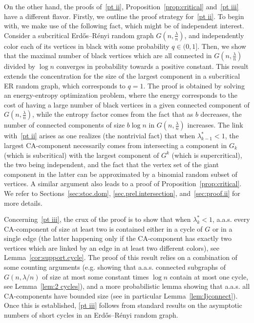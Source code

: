 \documentclass[10pt]{amsart}
\theoremstyle{definition}\newtheorem{defi}[theo]{Definition}\newtheorem{rema}[theo]{Remark}\newtheorem{exam}[theo]{Example}\newtheorem{exem}[theo]{Example}\newtheorem{nota}[theo]{Notation}
\begin{document}
On the other hand, the proofs of~\eqref{pt ii}, Proposition~\ref{prop:critical} and~\eqref{pt iii} have a different flavor. Firstly, we outline the proof strategy for~\eqref{pt ii}. To begin with, we make use of the following fact, which might be of independent interest. Consider a subcritical Erd\H{o}s--Rényi random graph $G(n,\frac{\lambda}{n})$, and independently color each of its vertices in black with some probability $q\in (0,1]$. Then, we show that the maximal number of black vertices which are all connected in $G(n,\frac{\lambda}{n})$ divided by $\log n$ converges in probability towards a positive constant. This result extends the concentration for the size of the largest component in a subcritical ER random graph, which corresponds to $q=1$. The proof is obtained by solving an energy-entropy optimization problem, where the energy corresponds to the cost of having a large number of black vertices in a given connected component of $G(n,\frac{\lambda}{n})$, while the entropy factor comes from the fact that as $b$ decreases, the number of connected components of size $b\log n$ in $G(n,\frac{\lambda}{n})$ increases. The link with~\eqref{pt ii} arises as one realizes (the nontrivial fact) that when $\lambda_{k-1}^*<1$, the largest CA-component necessarily comes from intersecting a component in $G_k$ (which is subcritical) with the largest component of $G^k$ (which is supercritical), the two being independent, and the fact that the vertex set of the giant component in the latter can be approximated by a binomial random subset of vertices. A similar argument also leads to a proof of Proposition~\ref{prop:critical}. We refer to Sections~\ref{sec:stoc.dom}, \ref{sec.prel.intersection}, and~\ref{sec:proof.ii} for more details.

Concerning~\eqref{pt iii}, the crux of the proof is to show that when $\lambda_k^*<1$, a.a.s. every CA-component of size at least two is contained either in a cycle of $G$ or in a single edge (the latter happening only if the CA-component has exactly two vertices which are linked by an edge in at least two different colors), see Lemma~\ref{cor:support.cycle}. The proof of this result relies on a combination of some counting arguments (e.g. showing that a.a.s. connected subgraphs of $G(n,\lambda/n)$ of size at most some constant times $\log n$ contain at most one cycle, see Lemma~\ref{lem:2 cycles}), and a more probabilistic lemma showing that a.a.s. all CA-components have bounded size (see in particular Lemma~\ref{lem:Ijconnect}). Once this is established, \eqref{pt iii} follows from standard results on the asymptotic numbers of short cycles in an Erd\H{o}s--Rényi random graph.
\end{document}
